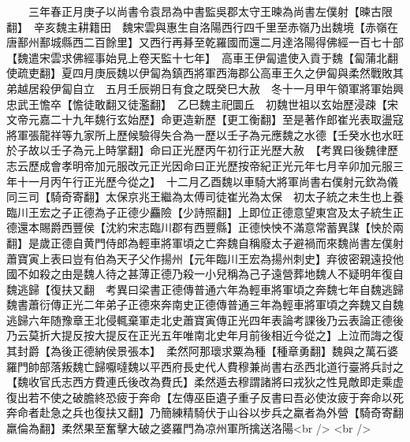 　　三年春正月庚子以尚書令袁昂為中書監吳郡太守王暕為尚書左僕射【暕古限翻】　辛亥魏主耕籍田　魏宋雲與惠生自洛陽西行四千里至赤嶺乃出魏境【赤嶺在唐鄯州鄯城縣西二百餘里】又西行再朞至乾羅國而還二月達洛陽得佛經一百七十部【魏遣宋雲求佛經事始見上卷天監十七年】　高車王伊匐遣使入貢于魏【匐蒲北翻使疏吏翻】夏四月庚辰魏以伊匐為鎮西將軍西海郡公高車王久之伊匐與柔然戰敗其弟越居殺伊匐自立　五月壬辰朔日有食之既癸巳大赦　冬十一月甲午領軍將軍始興忠武王憺卒【憺徒敢翻又徒濫翻】　乙巳魏主祀圜丘　初魏世祖以玄始歷浸疎【宋文帝元嘉二十九年魏行玄始歷】命更造新歷【更工衡翻】至是著作郎崔光表取盪寇將軍張龍祥等九家所上歷候驗得失合為一歷以壬子為元應魏之水德【壬癸水也水旺於子故以壬子為元上時掌翻】命曰正光歷丙午初行正光歷大赦　【考異曰後魏律歷志云歷成會孝明帝加元服改元正光因命曰正光歷按帝紀正光元年七月辛卯加元服三年十一月丙午行正光歷今從之】　十二月乙酉魏以車騎大將軍尚書右僕射元欽為儀同三司【騎奇寄翻】太保京兆王繼為太傅司徒崔光為太保　初太子統之未生也上養臨川王宏之子正德為子正德少麤險【少詩照翻】上即位正德意望東宫及太子統生正德還本賜爵西豐侯【沈約宋志臨川郡有西豐縣】正德怏怏不滿意常蓄異謀【怏於兩翻】是歲正德自黄門侍郎為輕車將軍頃之亡奔魏自稱廢太子避禍而來魏尚書左僕射蕭寶寅上表曰豈有伯為天子父作揚州【元年臨川王宏為揚州刺史】弃彼密親遠投他國不如殺之由是魏人待之甚薄正德乃殺一小兒稱為己子遠營葬地魏人不疑明年復自魏逃歸【復扶又翻　考異曰梁書正德傳普通六年為輕車將軍頃之奔魏七年自魏逃歸魏書蕭衍傳正光二年弟子正德來奔南史正德傳普通三年為輕車將軍頃之奔魏又自魏逃歸六年随豫章王北侵輒棄軍走北史蕭寶寅傳正光四年表論考課後乃云表論正德後乃云莫折大提反按大提反在正光五年唯南北史年月前後相近今從之】上泣而誨之復其封爵【為後正德納侯景張本】　柔然阿那瓌求粟為種【種章勇翻】魏與之萬石婆羅門帥部落叛魏亡歸嚈噠魏以平西府長史代人費穆兼尚書右丞西北道行臺將兵討之【魏收官氏志西方費連氏後改為費氏】柔然遁去穆謂諸將曰戎狄之性見敵即走乘虚復出若不使之破膽終恐疲于奔命【左傳巫臣遺子重子反書曰吾必使汝疲于奔命以死奔命者赴急之兵也復扶又翻】乃簡練精騎伏于山谷以步兵之羸者為外營【騎奇寄翻羸倫為翻】柔然果至奮擊大破之婆羅門為凉州軍所擒送洛陽<br />
<br />
